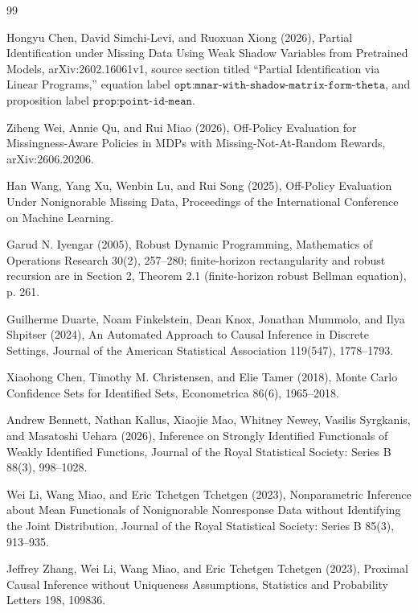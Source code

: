 \documentclass{article}
\begin{document}
\begin{thebibliography}{99}

   Hongyu Chen, David Simchi-Levi, and Ruoxuan Xiong (2026), Partial Identification under Missing Data Using Weak Shadow Variables from Pretrained Models, arXiv:2602.16061v1, source section titled ``Partial Identification via Linear Programs,'' equation label \(\texttt{opt:mnar-with-shadow-matrix-form-theta}\), and proposition label \(\texttt{prop:point-id-mean}\).

   Ziheng Wei, Annie Qu, and Rui Miao (2026), Off-Policy Evaluation for Missingness-Aware Policies in MDPs with Missing-Not-At-Random Rewards, arXiv:2606.20206.

   Han Wang, Yang Xu, Wenbin Lu, and Rui Song (2025), Off-Policy Evaluation Under Nonignorable Missing Data, Proceedings of the International Conference on Machine Learning.

   Garud N. Iyengar (2005), Robust Dynamic Programming, Mathematics of Operations Research 30(2), 257--280; finite-horizon rectangularity and robust recursion are in Section 2, Theorem 2.1 (finite-horizon robust Bellman equation), p. 261.

   Guilherme Duarte, Noam Finkelstein, Dean Knox, Jonathan Mummolo, and Ilya Shpitser (2024), An Automated Approach to Causal Inference in Discrete Settings, Journal of the American Statistical Association 119(547), 1778--1793.

   Xiaohong Chen, Timothy M. Christensen, and Elie Tamer (2018), Monte Carlo Confidence Sets for Identified Sets, Econometrica 86(6), 1965--2018.

   Andrew Bennett, Nathan Kallus, Xiaojie Mao, Whitney Newey, Vasilis Syrgkanis, and Masatoshi Uehara (2026), Inference on Strongly Identified Functionals of Weakly Identified Functions, Journal of the Royal Statistical Society: Series B 88(3), 998--1028.

   Wei Li, Wang Miao, and Eric Tchetgen Tchetgen (2023), Nonparametric Inference about Mean Functionals of Nonignorable Nonresponse Data without Identifying the Joint Distribution, Journal of the Royal Statistical Society: Series B 85(3), 913--935.

   Jeffrey Zhang, Wei Li, Wang Miao, and Eric Tchetgen Tchetgen (2023), Proximal Causal Inference without Uniqueness Assumptions, Statistics and Probability Letters 198, 109836.


\end{thebibliography}
\end{document}
